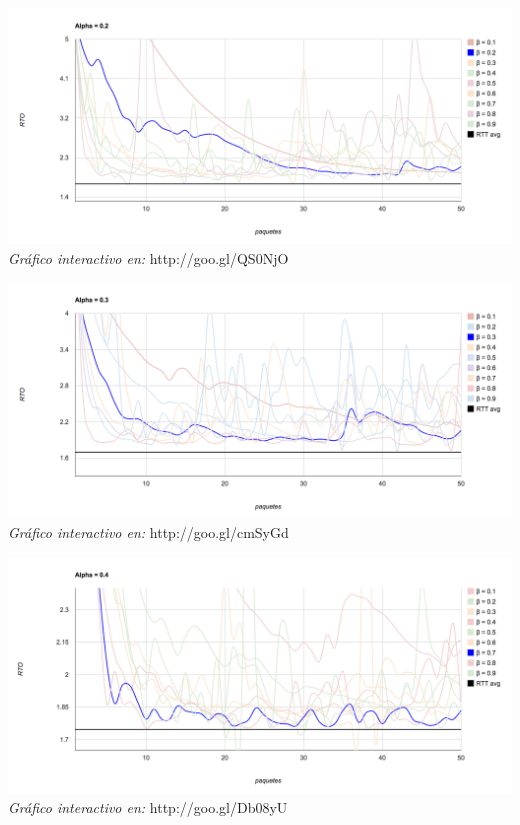 \begin{center}
	\includegraphics[scale=0.35]{graphics/rto_vs_paquetes_a_2.png}
	\textit{Gráfico interactivo en:} http://goo.gl/QS0NjO
\end{center}

\begin{center}
	\includegraphics[scale=0.35]{graphics/rto_vs_paquetes_a_3.png}
	\textit{Gráfico interactivo en:} http://goo.gl/cmSyGd
\end{center}

\begin{center}
	\includegraphics[scale=0.35]{graphics/rto_vs_paquetes_a_4.png}
	\textit{Gráfico interactivo en:} http://goo.gl/Db08yU
\end{center}


